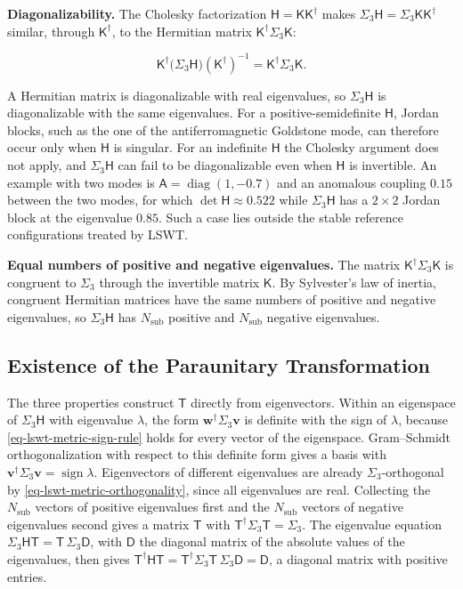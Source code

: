 \textbf{Diagonalizability.} The Cholesky factorization \(\mathsf H=\mathsf K\mathsf K^\dagger\) makes \(\Sigma_3\mathsf H=\Sigma_3\mathsf K\mathsf K^\dagger\) similar, through \(\mathsf K^\dagger\), to the Hermitian matrix \(\mathsf K^\dagger\Sigma_3\mathsf K\):

\[
\mathsf K^\dagger\big(\Sigma_3\mathsf H\big)(\mathsf K^\dagger)^{-1}=\mathsf K^\dagger\Sigma_3\mathsf K.
\]

A Hermitian matrix is diagonalizable with real eigenvalues, so \(\Sigma_3\mathsf H\) is diagonalizable with the same eigenvalues. For a positive-semidefinite \(\mathsf H\), Jordan blocks, such as the one of the antiferromagnetic Goldstone mode, can therefore occur only when \(\mathsf H\) is singular. For an indefinite \(\mathsf H\) the Cholesky argument does not apply, and \(\Sigma_3\mathsf H\) can fail to be diagonalizable even when \(\mathsf H\) is invertible. An example with two modes is \(\mathsf A=\operatorname{diag}(1,-0.7)\) and an anomalous coupling \(0.15\) between the two modes, for which \(\det\mathsf H\approx0.522\) while \(\Sigma_3\mathsf H\) has a \(2\times2\) Jordan block at the eigenvalue \(0.85\). Such a case lies outside the stable reference configurations treated by LSWT.

\textbf{Equal numbers of positive and negative eigenvalues.} The matrix \(\mathsf K^\dagger\Sigma_3\mathsf K\) is congruent to \(\Sigma_3\) through the invertible matrix \(\mathsf K\). By Sylvester's law of inertia, congruent Hermitian matrices have the same numbers of positive and negative eigenvalues, so \(\Sigma_3\mathsf H\) has \(N_{\mathrm{sub}}\) positive and \(N_{\mathrm{sub}}\) negative eigenvalues.

\subsection{Existence of the Paraunitary Transformation}

The three properties construct \(\mathsf T\) directly from eigenvectors. Within an eigenspace of \(\Sigma_3\mathsf H\) with eigenvalue \(\lambda\), the form \(\mathbf w^\dagger\Sigma_3\mathbf v\) is definite with the sign of \(\lambda\), because \eqref{eq-lswt-metric-sign-rule} holds for every vector of the eigenspace. Gram--Schmidt orthogonalization with respect to this definite form gives a basis with \(\mathbf v^\dagger\Sigma_3\mathbf v=\operatorname{sign}\lambda\). Eigenvectors of different eigenvalues are already \(\Sigma_3\)-orthogonal by \eqref{eq-lswt-metric-orthogonality}, since all eigenvalues are real. Collecting the \(N_{\mathrm{sub}}\) vectors of positive eigenvalues first and the \(N_{\mathrm{sub}}\) vectors of negative eigenvalues second gives a matrix \(\mathsf T\) with \(\mathsf T^\dagger\Sigma_3\mathsf T=\Sigma_3\). The eigenvalue equation \(\Sigma_3\mathsf H\mathsf T=\mathsf T\,\Sigma_3\mathsf D\), with \(\mathsf D\) the diagonal matrix of the absolute values of the eigenvalues, then gives \(\mathsf T^\dagger\mathsf H\mathsf T=\mathsf T^\dagger\Sigma_3\mathsf T\,\Sigma_3\mathsf D=\mathsf D\), a diagonal matrix with positive entries.

